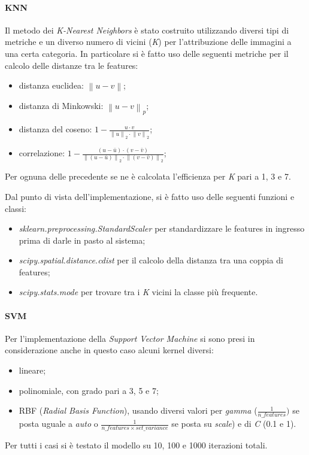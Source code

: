 \documentclass[11pt, a4paper, titlepage]{article}
\begin{document}
\paragraph{KNN}
Il metodo dei \emph{K-Nearest Neighbors} è stato costruito utilizzando diversi tipi di metriche e un diverso numero di vicini (\emph{K}) per l'attribuzione delle immagini a una certa categoria. In particolare si è fatto uso delle seguenti metriche per il calcolo delle distanze tra le features:
\begin{itemize}
    \item distanza euclidea: 
    \begin{math} \left \| u - v \right \| \end{math};
    \item distanza di Minkowski:
    \begin{math} \left \| u - v \right \|_p \end{math};
    \item distanza del coseno: 
    \begin{math} 1 - \frac{u \cdot v}{\left \| u \right \|_2 \cdot \left \| v \right \|_2} \end{math};
    \item correlazione: 
    \begin{math} 1 - \frac{(u - \bar u) \cdot (v - \bar v)}{\left \| (u - \bar u) \right \|_2 \cdot \left \| (v - \bar v) \right \|_2} \end{math};
\end{itemize}
Per ognuna delle precedente se ne è calcolata l'efficienza per \emph{K} pari a 1, 3 e 7.

\medskip
Dal punto di vista dell'implementazione, si è fatto uso delle seguenti funzioni e classi:
\begin{itemize}
    \item \emph{sklearn.preprocessing.StandardScaler} \cite{scikit-learn} per standardizzare le features in ingresso prima di darle in pasto al sistema;
    \item \emph{scipy.spatial.distance.cdist} \cite{scipy} per il calcolo della distanza tra una coppia di features;
    \item \emph{scipy.stats.mode} \cite{scipy} per trovare tra i \emph{K} vicini la classe più frequente.  
\end{itemize}

\paragraph{SVM}
Per l'implementazione della \emph{Support Vector Machine} si sono presi in considerazione anche in questo caso alcuni kernel diversi:
\begin{itemize}
    \item lineare; 
    \item polinomiale, con grado pari a 3, 5 e 7;
    \item RBF (\emph{Radial Basis Function}), usando diversi valori per \emph{gamma} ($\frac{1}{n\_features})$ se posta uguale a \emph{auto} o $\frac{1}{n\_features \times set\_variance}$ se posta su \emph{scale}) e di \emph{C} (0.1 e 1).
\end{itemize}
Per tutti i casi si è testato il modello su 10, 100 e 1000 iterazioni totali.
\end{document}
